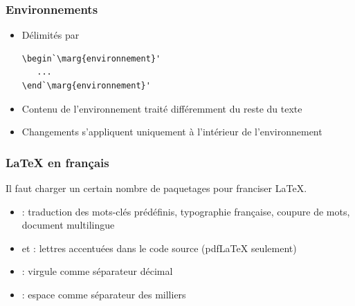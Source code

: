 \begin{frame}[fragile=singleslide]
  \frametitle{Environnements}
  \begin{itemize}
  \item Délimités par
\begin{lstlisting}
\begin`\marg{environnement}'
   ...
\end`\marg{environnement}'
    \end{lstlisting}
  \item Contenu de l'environnement traité différemment du reste du texte
  \item Changements s'appliquent uniquement à l'intérieur de
    l'environnement
  \end{itemize}
\end{frame}

\begin{frame}[fragile]
  \frametitle{{\LaTeX} en français}

  Il faut charger un certain nombre de paquetages pour franciser \LaTeX.

  \begin{itemize}
  \item {}: traduction des mots-clés prédéfinis,
    typographie française, coupure de mots, document multilingue
  \item {} et : lettres accentuées dans le
    code source (pdf{\LaTeX} seulement)
  \item {}: virgule comme séparateur décimal
  \item {}: espace comme séparateur des milliers
  \end{itemize}
\end{frame}

